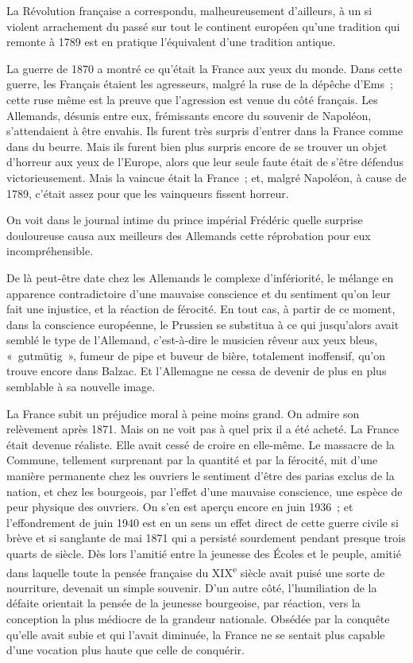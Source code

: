 \documentclass[french,twoside]{book} %
\begin{document}
La Révolution française a correspondu, malheureusement d'ailleurs, à un si violent arrachement du passé sur tout le continent européen qu'une tradition qui remonte à 1789 est en pratique l'équivalent d'une tradition antique.\par
La guerre de 1870 a montré ce qu'était la France aux yeux du monde. Dans cette guerre, les Français étaient les agresseurs, malgré la ruse de la dépêche d'Ems ; cette ruse même est la preuve que l'agression est venue du côté français. Les Allemands, désunis entre eux, frémissants encore du souvenir de Napoléon, s'attendaient à être envahis. Ils furent très surpris d'entrer dans la France comme dans du beurre. Mais ils furent bien plus surpris encore de se trouver un objet d'horreur aux yeux de l'Europe, alors que leur seule faute était de s'être défendus victorieusement. Mais la vaincue était la France ; et, malgré Napoléon, à cause de 1789, c'était assez pour que les vainqueurs fissent horreur.\par
On voit dans le journal intime du prince impérial Frédéric quelle surprise douloureuse causa aux meilleurs des Allemands cette réprobation pour eux incompréhensible.\par
De là peut-être date chez les Allemands le complexe d'infériorité, le mélange en apparence contradictoire d'une mauvaise conscience et du sentiment qu'on leur fait une injustice, et la réaction de férocité. En tout cas, à partir de ce moment, dans la conscience européenne, le Prussien se substitua à ce qui jusqu'alors avait semblé le type de l'Allemand, c'est-à-dire le musicien rêveur aux yeux bleus, « gutmütig », fumeur de pipe et buveur de bière, totalement inoffensif, qu'on trouve encore dans Balzac. Et l'Allemagne ne cessa de devenir de plus en plus semblable à sa nouvelle image.\par
La France subit un préjudice moral à peine moins grand. On admire son relèvement après 1871. Mais on ne voit pas à quel prix il a été acheté. La France était devenue réaliste. Elle avait cessé de croire en elle-même. Le massacre de la Commune, tellement surprenant par la quantité et par la férocité, mit d'une manière permanente chez les ouvriers le sentiment d'être des parias exclus de la nation, et chez les bourgeois, par l'effet d'une mauvaise conscience, une espèce de peur physique des ouvriers. On s'en est aperçu encore en juin 1936 ; et l'effondrement de juin 1940 est en un sens un effet direct de cette guerre civile si brève et si sanglante de mai 1871 qui a persisté sourdement pendant presque trois quarts de siècle. Dès lors l'amitié entre la jeunesse des Écoles et le peuple, amitié dans laquelle toute la pensée française du XIX\textsuperscript{e} siècle avait puisé une sorte de nourriture, devenait un simple souvenir. D'un autre côté, l'humiliation de la défaite orientait la pensée de la jeunesse bourgeoise, par réaction, vers la conception la plus médiocre de la grandeur nationale. Obsédée par la conquête qu'elle avait subie et qui l'avait diminuée, la France ne se sentait plus capable d'une vocation plus haute que celle de conquérir.\par
\end{document}
